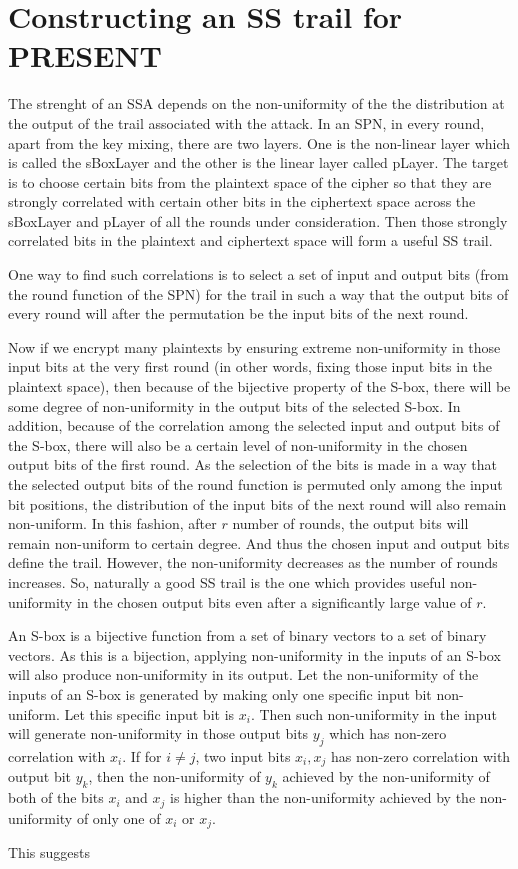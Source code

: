 \section{Constructing an SS trail for PRESENT} \label{section:choosing_ssa_trail}
The strenght of an SSA depends on the non-uniformity of the the distribution at the output of the trail associated with the attack. In an SPN, in every round, apart from the key mixing, there are two layers. One is the non-linear layer which is called the sBoxLayer and the other is the linear layer called pLayer. The target is to choose certain bits from the plaintext space of the cipher so that they are strongly correlated with certain other bits in the ciphertext space across the sBoxLayer and pLayer of all the rounds under consideration. Then those strongly correlated bits in the plaintext and ciphertext space will form a useful SS trail. \par \noindent One way to find such correlations is to select a set of input and output bits (from the round function of the SPN) for the trail in such a way that the output bits of every round will after the permutation be the input bits of the next round. \par \noindent Now if we encrypt many plaintexts by ensuring extreme non-uniformity in those input bits at the very first round (in other words, fixing those input bits in the plaintext  space), then because of the bijective property of the S-box, there will be some degree of non-uniformity in the output bits of the selected S-box. In addition, because of the correlation among the selected input and output bits of the S-box, there will also be a certain level of non-uniformity in the chosen output bits of the first round. As the selection of the bits is made in a way that the selected output bits of the round function is permuted only among the input bit positions, the distribution of the input bits of the  next round will also remain non-uniform. In this fashion, after $r$ number of rounds, the output bits will remain non-uniform to certain degree. And thus the chosen input and output bits define the trail. However, the non-uniformity decreases as the number of rounds increases. So, naturally a good SS trail is the one which provides useful non-uniformity in the chosen output bits even after a significantly large value of $r$. \par \noindent An S-box is a bijective function from a set of binary vectors to a set of binary vectors. As this is a bijection, applying non-uniformity in the inputs of an S-box will also produce non-uniformity in its output. Let the non-uniformity of the inputs of an S-box is generated by making only one specific input bit non-uniform. Let this specific input bit is $x_i$. Then such non-uniformity in the input will generate non-uniformity in those output bits $y_j$ which has non-zero correlation with $x_i$. If for $i \neq j$, two input bits $x_i,x_j$ has non-zero correlation with output bit $y_k$, then the non-uniformity of $y_k$ achieved by the non-uniformity of both of the bits $x_i$ and $x_j$ is higher than the non-uniformity achieved by the non-uniformity of only one of $x_i$ or $x_j$. \par \noindent This suggests 